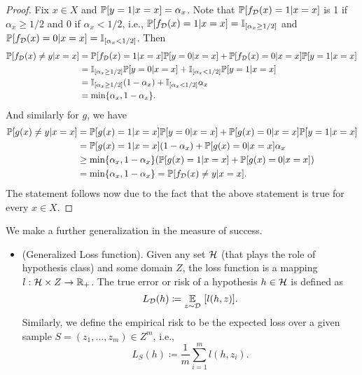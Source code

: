 \documentclass[11pt,a4paper]{article}
\begin{document}
\begin{proof}
Fix $x\in X$ and $\mathbb{P}[y = 1|x = x] = \alpha_x$. Note that $\mathbb{P}[f_{\mathcal{D}}(x) = 1|x = x]$ is 1 if $\alpha_x\ge 1/2$ and 0 if $\alpha_x< 1/2$, i.e., $\mathbb{P}[f_{\mathcal{D}}(x) = 1|x = x] = \mathbb{I}_{[\alpha_x\ge 1/2]}$ and $\mathbb{P}[f_{\mathcal{D}}(x) = 0|x = x] = \mathbb{I}_{[\alpha_x<1/2]}$. Then
\begin{align*}
\mathbb{P}[f_{\mathcal{D}}(x)\neq y|x=x] &= \mathbb{P}[f_{\mathcal{D}}(x) = 1|x=x] \mathbb{P}[y=0|x=x]+ \mathbb{P}[f_{\mathcal{D}}(x) = 0|x=x] \mathbb{P}[y=1|x=x] \\
&= \mathbb{I}_{[\alpha_x\ge 1/2]} \mathbb{P}[y=0|x=x]+ \mathbb{I}_{[\alpha_x< 1/2]} \mathbb{P}[y=1|x=x] \\
&= \mathbb{I}_{[\alpha_x\ge 1/2]} (1-\alpha_x)+ \mathbb{I}_{[\alpha_x< 1/2]} \alpha_x \\
&= \text{min}\{\alpha_x , 1-\alpha_x\}.
\end{align*}
And similarly for $g$, we have
\begin{align*}
\mathbb{P}[g(x)\neq y|x=x] &= \mathbb{P}[g(x) = 1|x=x] \mathbb{P}[y=0|x=x]+ \mathbb{P}[g(x) = 0|x=x] \mathbb{P}[y=1|x=x] \\
&= \mathbb{P}[g(x) = 1|x=x] (1-\alpha_x)+ \mathbb{P}[g(x) = 0|x=x] \alpha_x \\
&\ge \text{min}\{\alpha_x , 1-\alpha_x\}(\mathbb{P}[g(x) = 1|x=x] + \mathbb{P}[g(x) = 0|x=x])\\
&= \text{min}\{\alpha_x , 1-\alpha_x\} = \mathbb{P}[f_{\mathcal{D}}(x)\neq y|x=x].
\end{align*}
The statement follows now due to the fact that the above statement is true for
every $x\in X$.
\end{proof}

We make a further generalization in the measure of success.
\begin{itemize}
\item {(Generalized Loss function).} Given any set $\mathcal{H}$ (that plays the role of hypothesis class) and some domain $Z$, the loss function is a mapping $l:\mathcal{H}\times Z\rightarrow \mathbb{R}_+$. The true error or risk of a hypothesis $h\in \mathcal{H}$ is defined as
\begin{equation*}
L_{\mathcal{D}}(h) \coloneqq \underset{z\sim\mathcal{D}}{\mathbb{E}}\ [l(h,z)].
\end{equation*}
Similarly, we define the empirical risk to be the expected loss over a given sample $S = (z_1,\ldots,z_m)\in Z^m$, i.e.,
\begin{equation*}
L_S(h) \coloneqq \dfrac{1}{m}\sum_{i=1}^m l(h,z_i).
\end{equation*}
\end{itemize}
\end{document}
